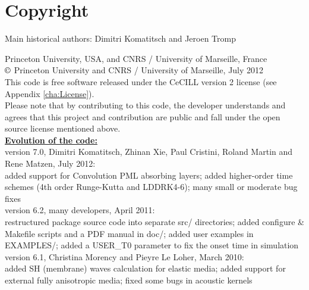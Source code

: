 
\chapter*{Copyright}


Main historical authors: Dimitri Komatitsch and Jeroen Tromp

Princeton University, USA, and CNRS / University of Marseille, France\\
$\copyright$ Princeton University and CNRS / University of Marseille, July 2012\\

\noindent
This code is free software released under the CeCILL version 2 license (see Appendix \ref{cha:License}).\\

\noindent
Please note that by contributing to this code, the developer understands and agrees that this project and contribution
are public and fall under the open source license mentioned above.\\

\noindent
\textbf{\underline{Evolution of the code:}}\\

version 7.0, Dimitri Komatitsch, Zhinan Xie, Paul Cristini, Roland Martin and Rene Matzen, July 2012:\\
added support for Convolution PML absorbing layers;
added higher-order time schemes (4th order Runge-Kutta and LDDRK4-6);
many small or moderate bug fixes\\

version 6.2, many developers, April 2011:\\
restructured package source code into separate src/ directories;
added configure \& Makefile scripts and a PDF manual in doc/;
added user examples in EXAMPLES/;
added a USER\_T0 parameter to fix the onset time in simulation\\

version 6.1, Christina Morency and Pieyre Le Loher, March 2010:\\
added SH (membrane) waves calculation for elastic media;
added support for external fully anisotropic media;
fixed some bugs in acoustic kernels\\

